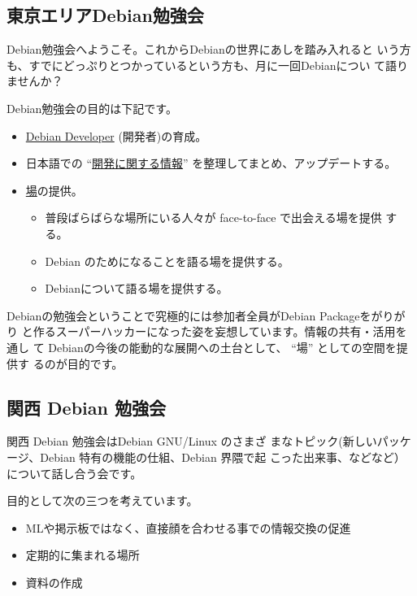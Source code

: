 \documentclass[mingoth,a4paper]{jsarticle}
\begin{document}

\subsection{東京エリアDebian勉強会}

 Debian勉強会へようこそ。これからDebianの世界にあしを踏み入れると
 いう方も、すでにどっぷりとつかっているという方も、月に一回Debianについ
 て語りませんか？

 Debian勉強会の目的は下記です。

\begin{itemize}
 \item \underline{Debian Developer} (開発者)の育成。
 \item 日本語での ``\underline{開発に関する情報}'' を整理してまとめ、アップデートする。
 \item \underline{場}の提供。
 \begin{itemize}
  \item 普段ばらばらな場所にいる人々が face-to-face で出会える場を提供
    する。
  \item Debian のためになることを語る場を提供する。
  \item Debianについて語る場を提供する。
 \end{itemize}
\end{itemize}

 Debianの勉強会ということで究極的には参加者全員がDebian Packageをがりがり
 と作るスーパーハッカーになった姿を妄想しています。情報の共有・活用を通し
 て Debianの今後の能動的な展開への土台として、 ``場'' としての空間を提供す
 るのが目的です。

\subsection{関西 Debian 勉強会}

 関西 Debian 勉強会はDebian GNU/Linux のさまざ
 まなトピック(新しいパッケージ、Debian 特有の機能の仕組、Debian 界隈で起
 こった出来事、などなど）について話し合う会です。

 目的として次の三つを考えています。
 \begin{itemize}
  \item MLや掲示板ではなく、直接顔を合わせる事での情報交換の促進
  \item 定期的に集まれる場所
  \item 資料の作成
 \end{itemize}
\end{document}
